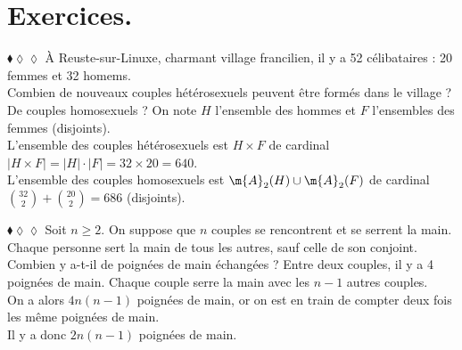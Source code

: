 \documentclass[11pt]{article}
\begin{document}
\section{Exercices.}

\begin{exercice}{$\blacklozenge\lozenge\lozenge$}{}
    À Reuste-sur-Linuxe, charmant village francilien, il y a 52 célibataires : 20 femmes et 32 homems.\\
    Combien de nouveaux couples hétérosexuels peuvent être formés dans le village ? De couples homosexuels ?
    \tcblower
    On note $H$ l'ensemble des hommes et $F$ l'ensembles des femmes (disjoints).\\
    L'ensemble des couples hétérosexuels est $H\times F$ de cardinal $|H\times F|=|H|\cdot|F|=32\times20=640$.\\
    L'ensemble des couples homosexuels est $\m{A}_2(H)\cup\m{A}_2(F)$ de cardinal $\binom{32}{2}+\binom{20}{2}=686$ (disjoints).
\end{exercice}

\begin{exercice}{$\blacklozenge\lozenge\lozenge$}{}
    Soit $n\geq 2$. On suppose que $n$ couples se rencontrent et se serrent la main. Chaque personne sert la main de tous les autres, sauf celle de son conjoint. Combien y a-t-il de poignées de main échangées ?
    \tcblower
    Entre deux couples, il y a 4 poignées de main. Chaque couple serre la main avec les $n-1$ autres couples.\\
    On a alors $4n(n-1)$ poignées de main, or on est en train de compter deux fois les même poignées de main.\\
    Il y a donc $2n(n-1)$ poignées de main.
\end{exercice}
\end{document}
